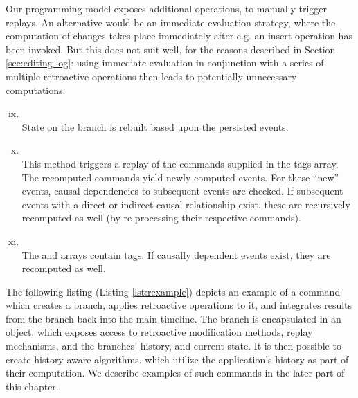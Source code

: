 Our programming model exposes additional operations, to manually trigger replays.
An alternative would be an immediate evaluation strategy, where the computation of
changes takes place immediately after e.g. an insert operation has been invoked. 
But this does not suit well, for the reasons described in Section \ref{sec:editing-log}:
using immediate evaluation in conjunction with a series of multiple retroactive
operations then leads to potentially unnecessary computations.

\begin{enumerate}[(i)] 
\setcounter{enumi}{8}
	\item {}\\
	State on the branch is rebuilt based upon the persisted events.

	\item {}\\
	This method triggers a replay of the commands supplied in the tags array.
	The recomputed commands yield newly computed events. For these
	``new'' events, causal dependencies to subsequent events are checked.
	If subsequent events with a direct or indirect causal relationship exist, 
	these are recursively recomputed as well (by re-processing their respective 
	commands).

	\item {}\\
	The  and  arrays contain tags.
	If causally dependent events exist, they are recomputed as well.
\end{enumerate}

The following listing (Listing \ref{lst:rexample}) depicts an example of a command 
which creates a branch, applies retroactive operations to it, and integrates results 
from the branch back into the main timeline.
The branch is encapsulated in an object, which exposes access to retroactive 
modification methods, replay mechanisms, and the branches' history, and current state.
%
It is then possible to create history-aware algorithms, which utilize the 
application's history as part of their computation. We describe examples of 
such commands in the later part of this chapter.

